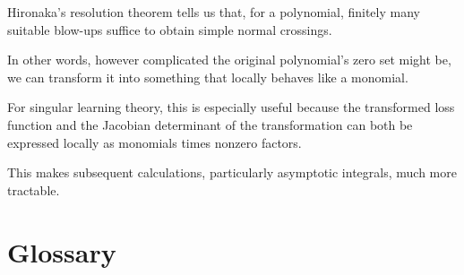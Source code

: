\documentclass[12pt]{article}
\begin{document}
Hironaka's resolution theorem tells us that, for a polynomial, finitely
many suitable blow-ups suffice to obtain simple normal crossings.

In other words, however complicated the original polynomial's zero set
might be, we can transform it into something that locally behaves like a
monomial.

For singular learning theory, this is especially useful because the
transformed loss function and the Jacobian determinant of the
transformation can both be expressed locally as monomials times nonzero
factors.

This makes subsequent calculations, particularly asymptotic integrals,
much more tractable.

\newpage
\section{Glossary}
\end{document}
